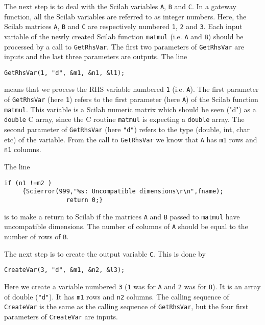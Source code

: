 \noindent
The next step is to deal with the Scilab variables \verb!A!, \verb!B! 
and \verb!C!. In a gateway function, all the Scilab variables
are referred to as integer numbers. Here, the Scilab matrices 
\verb!A!, \verb!B! and \verb!C! are 
respectively numbered \verb!1!, \verb!2! and \verb!3!. 
Each input variable of the newly created Scilab function
\verb!matmul! (i.e. \verb!A! and \verb!B!)
should be processed by a call to \verb!GetRhsVar!.
The first two parameters of  \verb!GetRhsVar! are inputs and the last
three parameters are outputs.
The line 
\begin{verbatim}
GetRhsVar(1, "d", &m1, &n1, &l1); 
\end{verbatim}
means that we process the RHS variable numbered \verb!1! (i.e. \verb!A!).
The first parameter of \verb!GetRhsVar! (here \verb!1!) refers to the
first parameter (here \verb!A!) of the Scilab function \verb!matmul!.
This variable is a Scilab numeric matrix which should be seen ("d") as a 
\verb!double! C array, since the C routine \verb!matmul! is
expecting a \verb!double! array. The second parameter of \verb!GetRhsVar!
(here \verb!"d"!) refers to the type (double, int, char etc) of the variable.
From the call to \verb!GetRhsVar! we know that \verb!A! has
\verb!m1! rows and \verb!n1! columns. 


\noindent
The line
\begin{verbatim}
if (n1 !=m2 ) 
     {Scierror(999,"%s: Uncompatible dimensions\r\n",fname);
                 return 0;}
\end{verbatim}
\normalsize
is to make a return to Scilab if the matrices \verb!A! and \verb!B! 
passed to \verb!matmul! have uncompatible dimensions. The number
of columns of \verb!A! should be equal to the number of rows of \verb!B!.

\noindent
The next step is to create the output variable \verb!C!. This is done by
\begin{verbatim}
CreateVar(3, "d", &m1, &n2, &l3);
\end{verbatim}
Here we create a variable numbered \verb!3! (\verb!1! was for \verb!A!
and \verb!2! was for \verb!B!). It is an array of double (\verb!"d"!).
It has \verb!m1! rows and \verb!n2! columns. 
The calling sequence of \verb!CreateVar! is the same as the calling sequence
of \verb!GetRhsVar!, but the four first parameters of \verb!CreateVar! 
are inputs. 

